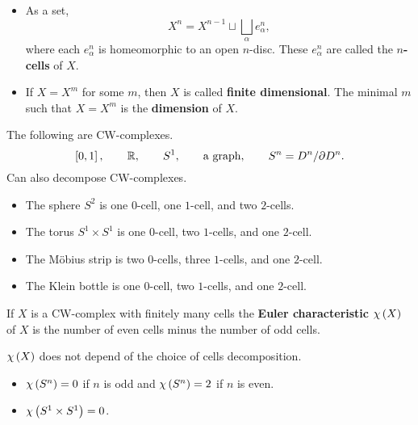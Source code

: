 \begin{remark*}
\hfill
\begin{itemize}
\item As a set,
$$ X^n = X^{n - 1} \sqcup \bigsqcup_\alpha e_\alpha^n, $$
where each $ e_\alpha^n $ is homeomorphic to an open $ n $-disc. These $ e_\alpha^n $ are called the \textbf{$ n $-cells} of $ X $.
\item If $ X = X^m $ for some $ m $, then $ X $ is called \textbf{finite dimensional}. The minimal $ m $ such that $ X = X^m $ is the \textbf{dimension} of $ X $.
\end{itemize}
\end{remark*}

\begin{example*}
The following are CW-complexes.
$$ \sbr{0, 1}, \qquad \R, \qquad S^1, \qquad \text{a graph}, \qquad S^n = D^n / \partial D^n. $$
Can also decompose CW-complexes.
\begin{itemize}
\item The sphere $ S^2 $ is one $ 0 $-cell, one $ 1 $-cell, and two $ 2 $-cells.
\item The torus $ S^1 \times S^1 $ is one $ 0 $-cell, two $ 1 $-cells, and one $ 2 $-cell.
\item The M\"obius strip is two $ 0 $-cells, three $ 1 $-cells, and one $ 2 $-cell.
\item The Klein bottle is one $ 0 $-cell, two $ 1 $-cells, and one $ 2 $-cell.
\end{itemize}
\end{example*}

\begin{definition*}
If $ X $ is a CW-complex with finitely many cells the \textbf{Euler characteristic} $ \chi\br{X} $ of $ X $ is the number of even cells minus the number of odd cells.
\end{definition*}

\begin{fact*}
$ \chi\br{X} $ does not depend of the choice of cells decomposition.
\end{fact*}

\begin{example*}
\hfill
\begin{itemize}
\item $ \chi\br{S^n} = 0 $ if $ n $ is odd and $ \chi\br{S^n} = 2 $ if $ n $ is even.
\item $ \chi\br{S^1 \times S^1} = 0 $.
\end{itemize}
\end{example*}

